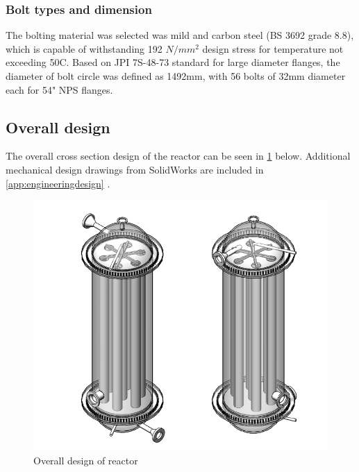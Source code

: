 \subsubsection{Bolt types and dimension}
The bolting material was selected was mild and carbon steel (BS 3692 grade 8.8), which is capable of withstanding 192 $N/mm^2$ design stress for temperature not exceeding 50C. Based on JPI 7S-48-73 standard for large diameter flanges, the diameter of bolt circle was defined as 1492mm, with 56 bolts of 32mm diameter each for 54" NPS flanges. 

\subsection{Overall design}
The overall cross section design of the reactor can be seen in \cref{fig:mainreactor} below. Additional mechanical design drawings from SolidWorks are included in \cref{app:engineeringdesign} .
\begin{figure}[h]
    \centering
    \includegraphics[width=0.6\linewidth]{chapters/2-reaction/figures/FYD reactor poster boy both.PNG}
    \caption{Overall design of reactor}
    \label{fig:mainreactor}
\end{figure}

